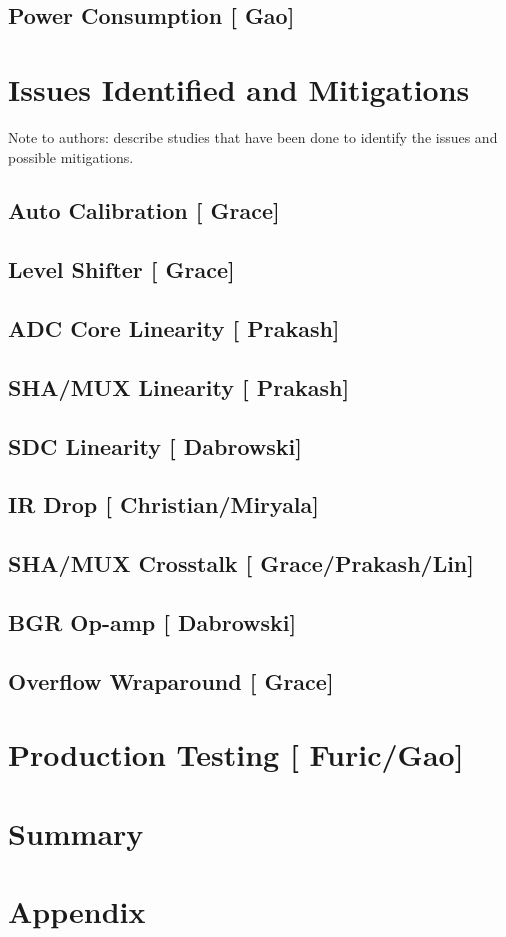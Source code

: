 \documentclass[10pt]{article}
\begin{document}
\subsection{Power Consumption [{\color{red} Gao}] }



\section{Issues Identified and Mitigations}
Note to authors: describe studies that have been done to identify the issues and possible mitigations.

\subsection{Auto Calibration [{\color{red} Grace}] }

\subsection{Level Shifter  [{\color{red} Grace}] }

\subsection{ADC Core Linearity  [{\color{red} Prakash}] }

\subsection{SHA/MUX Linearity  [{\color{red} Prakash}] }
\subsection{SDC Linearity  [{\color{red} Dabrowski}] }

\subsection{IR Drop [{\color{red} Christian/Miryala}] }

\subsection{SHA/MUX Crosstalk [{\color{red} Grace/Prakash/Lin}] }

\subsection{BGR Op-amp	 [{\color{red} Dabrowski}] }

\subsection{Overflow Wraparound  [{\color{red} Grace}] }


\section{Production Testing   [{\color{red} Furic/Gao}] }


\section{Summary}  
%	

\newpage



\newpage
\section*{Appendix}

\end{document}
